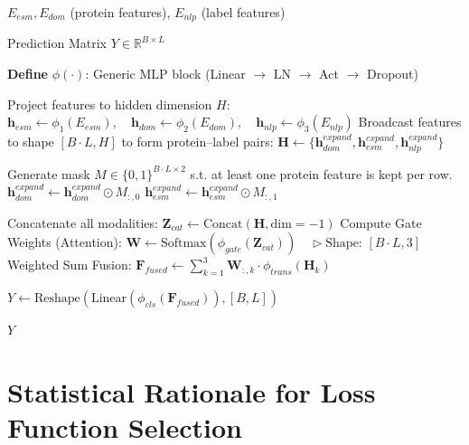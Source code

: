 \documentclass{article}
\begin{document}
\begin{algorithm}
\caption{MZSGO Workflow}
\label{alg:mzsgo}
\begin{algorithmic}[1]

\REQUIRE $E_{esm}, E_{dom}$ (protein features), $E_{nlp}$ (label features)

\ENSURE Prediction Matrix $Y \in \mathbb{R}^{B \times L}$

\STATE \textbf{Define} $\phi(\cdot)$: Generic MLP block (Linear $\to$ LN $\to$ Act $\to$ Dropout)

\vspace{0.1cm}
\STATE {}
\STATE Project features to hidden dimension  $H$:
\STATE $\mathbf{h}_{esm} \leftarrow \phi_{1}(E_{esm}), \quad \mathbf{h}_{dom} \leftarrow \phi_{2}(E_{dom}), \quad \mathbf{h}_{nlp} \leftarrow \phi_{3}(E_{nlp})$
\STATE Broadcast features to shape $[B \cdot L, H]$ to form protein–label pairs:
\STATE $\mathbf{H} \leftarrow \{ \mathbf{h}_{dom}^{expand}, \mathbf{h}_{esm}^{expand}, \mathbf{h}_{nlp}^{expand} \}$

\vspace{0.1cm}
\STATE {}
\STATE Generate mask $M \in \{0,1\}^{B \cdot L \times 2}$ s.t. at least one protein feature is kept per row.
\STATE $\mathbf{h}_{dom}^{expand} \leftarrow \mathbf{h}_{dom}^{expand} \odot M_{:,0}$
\STATE $\mathbf{h}_{esm}^{expand} \leftarrow \mathbf{h}_{esm}^{expand} \odot M_{:,1}$
\ENDIF

\vspace{0.1cm}
\STATE {}
\STATE Concatenate all modalities: $\mathbf{Z}_{cat} \leftarrow \text{Concat}(\mathbf{H}, \text{dim}=-1)$
\STATE Compute Gate Weights (Attention):
\STATE $\mathbf{W} \leftarrow \text{Softmax}(\phi_{gate}(\mathbf{Z}_{cat})) \quad \triangleright \text{Shape: } [B \cdot L, 3]$
\STATE Weighted Sum Fusion:
\STATE $\mathbf{F}_{fused} \leftarrow \sum_{k=1}^{3} \mathbf{W}_{:,k} \cdot \phi_{trans}(\mathbf{H}_k)$

\vspace{0.1cm}
\STATE {}
\STATE $Y \leftarrow \text{Reshape}(\text{Linear}(\phi_{cls}(\mathbf{F}_{fused})), [B, L])$

\RETURN $Y$

\end{algorithmic}
\end{algorithm}

\section{Statistical Rationale for Loss Function Selection}
\end{document}
